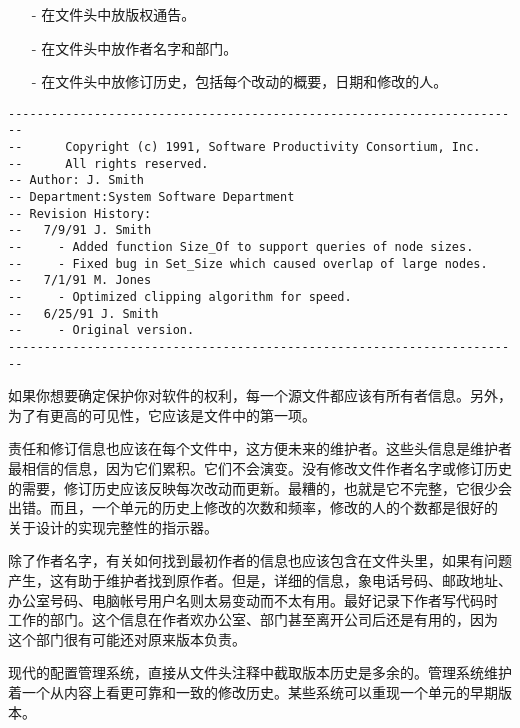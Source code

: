 \begin{itemize}
    \item[-] 在文件头中放版权通告。
    \item[-] 在文件头中放作者名字和部门。
    \item[-] 在文件头中放修订历史，包括每个改动的概要，日期和修改的人。 
\end{itemize}

\begin{blockindent}
\begin{lstlisting}
------------------------------------------------------------------------
--      Copyright (c) 1991, Software Productivity Consortium, Inc.
--      All rights reserved.
-- Author: J. Smith
-- Department:System Software Department
-- Revision History:
--   7/9/91 J. Smith
--     - Added function Size_Of to support queries of node sizes.
--     - Fixed bug in Set_Size which caused overlap of large nodes.
--   7/1/91 M. Jones
--     - Optimized clipping algorithm for speed.
--   6/25/91 J. Smith
--     - Original version.
------------------------------------------------------------------------
\end{lstlisting}
\end{blockindent}

\begin{blockindent}
如果你想要确定保护你对软件的权利，每一个源文件都应该有所有者信息。另外，
为了有更高的可见性，它应该是文件中的第一项。

责任和修订信息也应该在每个文件中，这方便未来的维护者。这些头信息是维护者
最相信的信息，因为它们累积。它们不会演变。没有修改文件作者名字或修订历史
的需要，修订历史应该反映每次改动而更新。最糟的，也就是它不完整，它很少会
出错。而且，一个单元的历史上修改的次数和频率，修改的人的个数都是很好的
关于设计的实现完整性的指示器。

除了作者名字，有关如何找到最初作者的信息也应该包含在文件头里，如果有问题
产生，这有助于维护者找到原作者。但是，详细的信息，象电话号码、邮政地址、
办公室号码、电脑帐号用户名则太易变动而不太有用。最好记录下作者写代码时
工作的部门。这个信息在作者欢办公室、部门甚至离开公司后还是有用的，因为
这个部门很有可能还对原来版本负责。
\end{blockindent}

\begin{blockindent}
现代的配置管理系统，直接从文件头注释中截取版本历史是多余的。管理系统维护
着一个从内容上看更可靠和一致的修改历史。某些系统可以重现一个单元的早期版本。
\end{blockindent}

